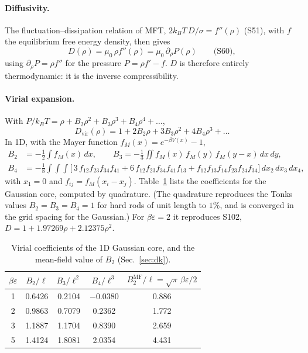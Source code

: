 \documentclass[11pt]{article}
\newcommand{\MF}{\mathrm{MF}}
\newcommand{\vir}{\mathrm{vir}}
\begin{document}
\paragraph{Diffusivity.} The fluctuation--dissipation relation of MFT,
$2k_BT\,D/\sigma = f''(\rho)$ (S51), with $f$ the equilibrium free energy
density, then gives
\begin{equation}\label{eq:D}
  D(\rho) = \mu_0\,\rho f''(\rho) = \mu_0\,\partial_\rho P(\rho)
  \qquad\text{(S60)},
\end{equation}
using $\partial_\rho P = \rho f''$ for the pressure $P=\rho f'-f$. $D$ is
therefore entirely thermodynamic: it is the inverse compressibility.

\paragraph{Virial expansion.} With
$P/k_BT = \rho + B_2\rho^2 + B_3\rho^3 + B_4\rho^4 + \dots$,
\begin{equation}\label{eq:Dvir}
  D_\vir(\rho) = 1 + 2B_2\rho + 3B_3\rho^2 + 4B_4\rho^3 + \dots
\end{equation}
In 1D, with the Mayer function $f_M(x) = e^{-\beta V(x)}-1$,
\begin{align}
  B_2 &= -\tfrac12\int f_M(x)\,dx, \qquad
  B_3 = -\tfrac13\iint f_M(x)\,f_M(y)\,f_M(y-x)\,dx\,dy, \\
  B_4 &= -\tfrac18\int\!\!\int\!\!\int \big[\,3\,f_{12}f_{23}f_{34}f_{41}
        + 6\,f_{12}f_{23}f_{34}f_{41}f_{13}
        + f_{12}f_{13}f_{14}f_{23}f_{24}f_{34}\big]\,dx_2\,dx_3\,dx_4 ,
\end{align}
with $x_1=0$ and $f_{ij}=f_M(x_i-x_j)$. Table~\ref{tab:B} lists the
coefficients for the Gaussian core, computed by quadrature. (The quadrature
reproduces the Tonks values $B_2=B_3=B_4=1$ for hard rods of unit length to
$1\%$, and is converged in the grid spacing for the Gaussian.) For
$\beta\varepsilon=2$ it reproduces S102,
$D = 1 + 1.97269\rho + 2.12375\rho^2$.

\begin{table}[h]
\centering
\begin{tabular}{ccccc}
\toprule
$\beta\varepsilon$ & $B_2/\ell$ & $B_3/\ell^2$ & $B_4/\ell^3$ & $B_2^\MF/\ell = \sqrt\pi\,\beta\varepsilon/2$ \\
\midrule
1 & 0.6426 & 0.2104 & $-0.0380$ & 0.886 \\
2 & 0.9863 & 0.7079 & 0.2362 & 1.772 \\
3 & 1.1887 & 1.1704 & 0.8390 & 2.659 \\
5 & 1.4124 & 1.8081 & 2.0354 & 4.431 \\
\bottomrule
\end{tabular}
\caption{Virial coefficients of the 1D Gaussian core, and the mean-field value
of $B_2$ (Sec.~\ref{sec:dk}).}
\label{tab:B}
\end{table}
\end{document}
